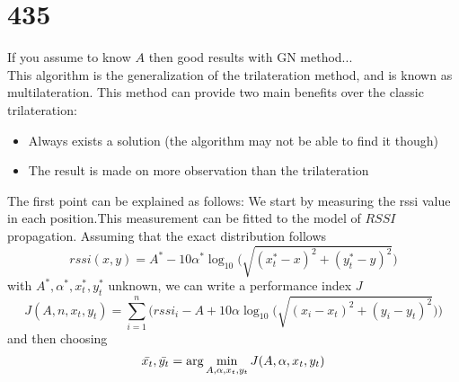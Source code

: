 \documentclass[12pt]{report}
\begin{document}
\section{435}
If you assume to know $A$ then good results with GN method...\\
This algorithm is the generalization of the trilateration method, and is known as multilateration. 
This method can provide two main benefits over the classic trilateration:
\begin{itemize}
    \item Always exists a solution (the algorithm may not be able to find it though)
    \item The result is made on more observation than the trilateration
\end{itemize}
The first point can be explained as follows:
We start by measuring the rssi value in each position.This measurement can be fitted to the model of $RSSI$ propagation. Assuming that the exact distribution follows 
\begin{equation}
rssi(x,y)=A^*-10\alpha^*\log_{10}\big(\sqrt{(x_t^*-x)^2+(y_t^*-y)^2}\big)    
\end{equation}
with $A^*,\alpha^*,x^*_t,y^*_t$ unknown, we can write a performance index $J$
\begin{equation}
    J(A,n,x_t,y_t)=\sum_{i=1}^n\bigg(rssi_i-A+10\alpha\log_{10}\big(\sqrt{(x_i-x_t)^2+(y_i-y_t)^2}\big)\bigg)
\end{equation}
and then choosing 
\begin{equation}
\Bar{x_t}, \Bar{y_t}=\arg \min_{A,\alpha,x_t,y_t}J(A,\alpha,x_t,y_t)
\end{equation}
\clearpage



\clearpage
\end{document}
